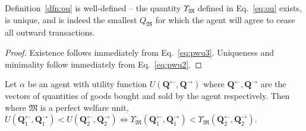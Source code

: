 \documentclass[smallextended]{svjour3}
\newcommand{\quants}{\ensuremath{Q}} %
\newcommand{\quantl}{\ensuremath{\mathbf{Q}}} %
\newcommand{\agenta}{\ensuremath{\alpha}}
\newcommand{\money}{\ensuremath{\mathfrak{M}}}
\newcommand{\utility}{\ensuremath{U}}
\newcommand{\outility}{\ensuremath{\Upsilon}}
\begin{document}
\begin{theorem}
    \label{thm:unique}
    Definition~\ref{dfn:ou} is well-defined -- the quantity $\outility_\money$ defined in Eq.~\ref{eq:ou} exists, is unique, and is indeed the smallest $\quants_\money$ for which the agent will agree to cease all outward transactions. 
\end{theorem}
\begin{proof}
    Existence follows immediately from Eq.~\ref{eq:pwu3}. Uniqueness and minimality follow immediately from Eq.~\ref{eq:pwu2}.
\end{proof}

\begin{theorem}
    \label{thm:welfare}
    Let $\agenta$ be an agent with utility function $\utility(\quantl^{\leftarrow}, \quantl^{\rightarrow})$ where $\quantl^\leftarrow, \quantl^\rightarrow$ are the vectors of quantities of goods bought and sold by the agent respectively. Then where $\money$ is a perfect welfare unit, $\utility(\quantl_1^\leftarrow, \quantl_1^\rightarrow)<\utility(\quantl_2^\leftarrow, \quantl_2^\rightarrow) \iff \outility_\money(\quantl_1^\leftarrow, \quantl_1^\rightarrow)<\outility_\money(\quantl_2^\leftarrow, \quantl_2^\rightarrow)$.
\end{theorem}
\end{document}
